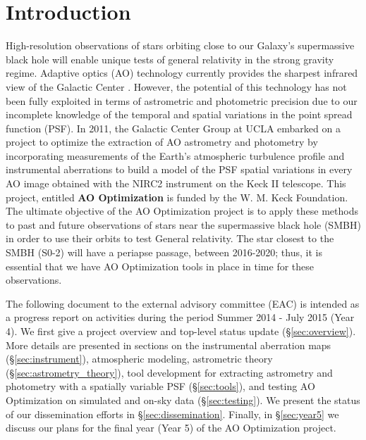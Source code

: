 \section{Introduction}

High-resolution observations of stars orbiting close to our Galaxy's supermassive black hole will enable unique tests of general relativity in the strong gravity regime. Adaptive optics (AO) technology currently provides the sharpest infrared view of the Galactic Center \cite{Ghez_2005}. However, the potential of this technology has not been fully exploited in terms of astrometric and photometric precision due to our incomplete knowledge of the temporal and spatial variations in the point spread function (PSF). In 2011, the Galactic Center Group at UCLA embarked on a project to optimize the extraction of AO astrometry and photometry by incorporating measurements of the Earth's atmospheric turbulence profile and instrumental aberrations to build a model of the PSF spatial variations in every AO image obtained with the NIRC2 instrument on the Keck II telescope. This project, entitled \textbf{AO Optimization} is funded by the W. M. Keck Foundation. The ultimate objective of the AO Optimization project is to apply these methods to past and future observations of stars near the supermassive black hole (SMBH) in order to use their orbits to test General relativity. The star closest to the SMBH (S0-2) will have a periapse passage, between 2016-2020; thus, it is essential that we have AO Optimization tools in place in time for these observations. 

The following document to the external advisory committee (EAC) is intended as a progress report on activities during the period Summer 2014 - July 2015 (Year 4). We first give a project overview and top-level status update (\S\ref{sec:overview}). More details are presented in sections on the instrumental aberration maps (\S\ref{sec:instrument}), atmospheric modeling, astrometric theory (\S\ref{sec:astrometry_theory}), tool development for extracting astrometry and photometry with a spatially variable PSF (\S\ref{sec:tools}), and testing AO Optimization on simulated and on-sky data (\S\ref{sec:testing}). We present the status of our dissemination efforts in \S\ref{sec:dissemination}. Finally, in \S\ref{sec:year5} we discuss our plans for the final year (Year 5) of the AO Optimization project.


